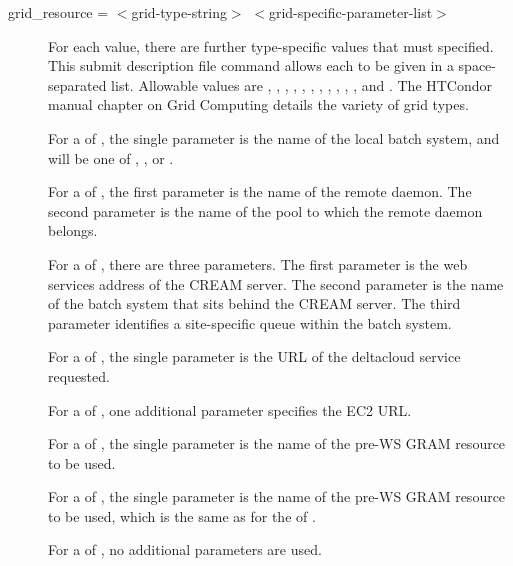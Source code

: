\begin{description}
\label{condor-submit-grid-resource}
\item[grid\_resource = $<$grid-type-string$>$ $<$grid-specific-parameter-list$>$ ]
For each  value, 
there are further type-specific values that must specified.
This submit description file command allows each to
be given in a space-separated list.
Allowable  values are
, 
, , 
, 
,
, ,
, , ,
,
and .
The HTCondor manual chapter on Grid Computing details the variety of 
grid types.

For a  of ,
the single parameter is the name of the local batch system,
and will be one of , , or .

For a  of ,
the first parameter is the name of the remote 
daemon.
The second parameter is the name of the pool to which the remote
 daemon belongs.

For a  of ,
there are three parameters.
The first parameter is the web services address of the CREAM server.
The second parameter is the 
name of the batch system that sits behind the CREAM server.
The third parameter identifies a site-specific queue
within the batch system.

For a  of ,
the single parameter is the URL of the deltacloud service requested.

For a  of ,
one additional parameter specifies the EC2 URL. 

For a  of ,
the single parameter is the name of the pre-WS GRAM resource to be used.

For a  of ,
the single parameter is the name of the pre-WS GRAM resource to be used,
which is the same as for the  of .

For a  of , no additional
parameters are used.


\end{description}
